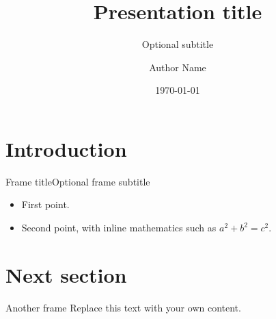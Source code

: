 \documentclass[aspectratio=169, 11pt]{beamer}
\title{Presentation title}
\subtitle{Optional subtitle}
\author[A. Name]{Author Name}
\institute{Affiliation}
\date{\today}
\begin{document}
\fcdttitleframe

\section{Introduction}

\begin{frame}{Frame title}{Optional frame subtitle}
  \begin{itemize}
    \item First point.
    \item Second point, with inline mathematics such as \(a^2 + b^2 = c^2\).
  \end{itemize}
\end{frame}

\section{Next section}

\begin{frame}{Another frame}
  Replace this text with your own content.
\end{frame}

\end{document}
